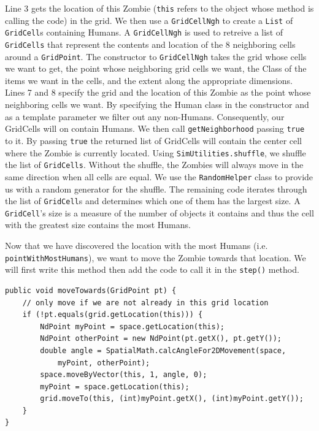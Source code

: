 \documentclass[11pt]{amsart}
\begin{document}
Line 3 gets the location of this Zombie (\texttt{this} refers to the object whose method is calling the code) in the grid. We then use a \texttt{GridCellNgh} to create a \texttt{List} of \texttt{GridCell}s containing Humans. A  \texttt{GridCellNgh} is used to retreive a list of \texttt{GridCells} that represent the contents and location of the 8 neighboring cells around a \texttt{GridPoint}. The constructor to \texttt{GridCellNgh} takes the grid whose cells we want to get, the point whose neighboring grid cells we want, the Class of the items we want in the cells, and the extent along the appropriate dimensions. Lines 7 and 8 specify the grid and the location of this Zombie as the point whose neighboring cells we want. By specifying the Human class in the constructor and as a template parameter we filter out any non-Humans. Consequently, our GridCells will on contain Humans. We then call \texttt{getNeighborhood} passing \texttt{true} to it. By passing \texttt{true} the returned list of GridCells will contain the center cell where the Zombie is currently located. Using \texttt{SimUtilities.shuffle}, we shuffle the list of \texttt{GridCells}. Without the shuffle, the Zombies will always move in the same direction when all cells are equal. We use the \texttt{RandomHelper} class to provide us with a random generator for the shuffle. The remaining code iterates through the list of \texttt{GridCell}s and determines which one of them has the largest size. A \texttt{GridCell}'s size is a measure of the number of objects it contains and thus the cell with the greatest size contains the most Humans.

Now that we have discovered the location with the most Humans (i.e. \texttt{pointWithMostHumans}), we want to move the Zombie towards that location. We will first write this method then add the code to call it in the \texttt{step()} method.

\noindent\begin{minipage}[h]{\textwidth}
\vspace{.2in}
\lstset{language=java,caption=moveTowards Method}
\begin{lstlisting}
public void moveTowards(GridPoint pt) {
	// only move if we are not already in this grid location
	if (!pt.equals(grid.getLocation(this))) {
		NdPoint myPoint = space.getLocation(this);
		NdPoint otherPoint = new NdPoint(pt.getX(), pt.getY());
		double angle = SpatialMath.calcAngleFor2DMovement(space, 
			myPoint, otherPoint);
		space.moveByVector(this, 1, angle, 0);
		myPoint = space.getLocation(this);
		grid.moveTo(this, (int)myPoint.getX(), (int)myPoint.getY());
	}
}
\end{lstlisting}
\vspace{.2in}
\end{minipage}
\end{document}
